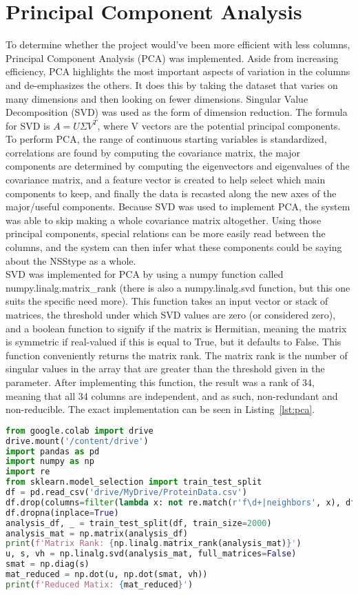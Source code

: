 \documentclass[12pt,letterpaper,oneside,reqno]{book}
\theoremstyle{plain}
\theoremstyle{definition}
\theoremstyle{plain}
\theoremstyle{remark}
\theoremstyle{plain}
\theoremstyle{definition}
\theoremstyle{plain}
\begin{document}
\section{Principal Component Analysis}
To determine whether the project would've been more efficient with less columns, Principal Component Analysis (PCA) was implemented. Aside from increasing efficiency, PCA highlights the most important aspects of variation in the columns and de-emphasizes the others. It does this by taking the dataset that varies on many dimensions and then looking on fewer dimensions. Singular Value Decomposition (SVD) was used as the form of dimension reduction. The formula for SVD is $A=U\Sigma V^T$, where V vectors are the potential principal components. To perform PCA, the range of continuous starting variables is standardized, correlations are found by computing the covariance matrix, the major components are determined by computing the eigenvectors and eigenvalues of the covariance matrix, and a feature vector is created to help select which main components to keep, and finally the data is recasted along the new axes of the major/useful components. Because SVD was used to implement PCA, the system was able to skip making a whole covariance matrix altogether. Using those principal components, special relations can be more easily read between the columns, and the system can then infer what these components could be saying about the NSStype as a whole. \\
\indent SVD was implemented for PCA by using a numpy function called numpy.linalg.matrix\_rank (there is also a numpy.linalg.svd function, but this one suits the specific need more). This function takes an input vector or stack of matrices, the threshold under which SVD values are zero (or considered zero), and a boolean function to signify if the matrix is Hermitian, meaning the matrix is symmetric if real-valued if this is equal to True, but it defaults to False. This function conveniently returns the matrix rank. The matrix rank is the number of singular values in the array that are greater than the threshold given in the parameter. After implementing this function, the result was a rank of 34, meaning that all 34 columns are independent, and as such, non-redundant and non-reducible. The exact implementation can be seen in Listing~\ref{lst:pca}. 

\begin{lstlisting}[language=Python, caption={Code for Performing Principle Component Analysis (PCA)}, label=lst:pca, frame=single]
from google.colab import drive
drive.mount('/content/drive')
import pandas as pd
import numpy as np
import re
from sklearn.model_selection import train_test_split
df = pd.read_csv('drive/MyDrive/ProteinData.csv')
df.drop(columns=filter(lambda x: not re.match(r'f\d+|neighbors', x), df.columns), inplace=True)
df.dropna(inplace=True)
analysis_df, _ = train_test_split(df, train_size=2000)
analysis_mat = np.matrix(analysis_df)
print(f'Matrix Rank: {np.linalg.matrix_rank(analysis_mat)}')
u, s, vh = np.linalg.svd(analysis_mat, full_matrices=False)
smat = np.diag(s)
mat_reduced = np.dot(u, np.dot(smat, vh))
print(f'Reduced Matix: {mat_reduced}')
\end{lstlisting}
\end{document}
